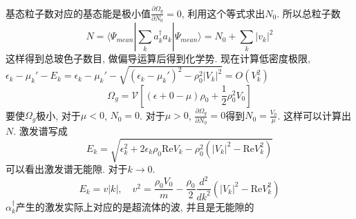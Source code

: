 \documentclass[a4paper,11pt]{article}
\begin{document}
基态粒子数对应的基态能是极小值$\frac{\partial \Omega_g}{\partial N_0}=0$, 利用这个等式求出$N_0$. 所以总粒子数
\begin{equation*}
  N=\langle\Psi_{mean}|\sum_{k}a_k^\dag a_k|\Psi_{mean}\rangle=N_0+\sum_{k}|v_k|^2
\end{equation*}
这样得到总玻色子数目, 做偏导运算后得到化学势. 现在计算低密度极限, $\epsilon_k-\mu_k'-E_k=\epsilon_k-\mu_k'-\sqrt{(\epsilon_k-\mu_k')^2-\rho_0^2|V_k|^2}=O(V_k^2)$
\begin{equation*}
  \Omega_g=\mathcal{V}[(\epsilon+0-\mu)\rho_0+\frac{1}{2}\rho_0^2V_0]
\end{equation*}
要使$\Omega_g$极小, 对于$\mu<0$,  $N_0=0$. 对于$\mu>0$, $\frac{\partial \Omega_g}{\partial N_0}=0$得到$N_0=\frac{V_0}{\mu}$. 这样可以计算出$N$. 激发谱写成
\begin{equation*}
  E_k=\sqrt{\epsilon_k^2+2\epsilon_k\rho_0\mathrm{Re}V_k-\rho_0^2(|V_k|^2-\mathrm{Re}V_k^2)}
\end{equation*}
可以看出激发谱无能隙. 对于$k\to0$.
\begin{equation*}
  E_k=v|k|,\quad v^2=\frac{\rho_0V_0}{m}-\frac{\rho_0}{2}\frac{d^2}{dk^2}(|V_k|^2-\mathrm{Re}V_k^2)
\end{equation*}
$\alpha_k^\dag$产生的激发实际上对应的是超流体的波, 并且是无能隙的
\end{document}
